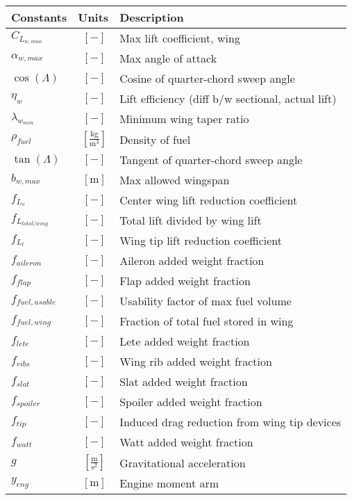 % 

{\footnotesize
\begin{supertabular}{lcl}
\toprule
Constants & Units & Description \\ \midrule
$C_{L_{w,max}}$ & $~[-]$ & Max lift coefficient, wing \\
$\alpha_{w,max}$ & $~[-]$ & Max angle of attack \\
$\cos(\Lambda)$ & $~[-]$ & Cosine of quarter-chord sweep angle \\
$\eta_w$ & $~[-]$ & Lift efficiency (diff b/w sectional, actual lift) \\
$\lambda_{w_{min}}$ & $~[-]$ & Minimum wing taper ratio \\
$\rho_{fuel}$ & $~\mathrm{[\tfrac{kg}{m^{3}}]}$ & Density of fuel \\
$\tan(\Lambda)$ & $~[-]$ & Tangent of quarter-chord sweep angle \\
$b_{w,max}$ & $~\mathrm{[m]}$ & Max allowed wingspan \\
$f_{L_{o}}$ & $~[-]$ & Center wing lift reduction coefficient \\
$f_{L_{total/wing}}$ & $~[-]$ & Total lift divided by wing lift\\
$f_{L_{t}}$ & $~[-]$ & Wing tip lift reduction coefficient \\
$f_{aileron}$ & $~[-]$ & Aileron added weight fraction \\
$f_{flap}$ & $~[-]$ & Flap added weight fraction \\
$f_{fuel, usable}$ & $~[-]$ & Usability factor of max fuel volume\\
$f_{fuel, wing}$ & $~[-]$ & Fraction of total fuel stored in wing\\
$f_{lete}$ & $~[-]$ & Lete added weight fraction \\
$f_{ribs}$ & $~[-]$ & Wing rib added weight fraction \\
$f_{slat}$ & $~[-]$ & Slat added weight fraction \\
$f_{spoiler}$ & $~[-]$ & Spoiler added weight fraction \\
$f_{tip}$ & $~[-]$ & Induced drag reduction from wing tip devices \\
$f_{watt}$ & $~[-]$ & Watt added weight fraction \\
$g$ & $~\mathrm{[\tfrac{m}{s^{2}}]}$ & Gravitational acceleration \\
$y_{eng}$ & $~\mathrm{[m]}$ & Engine moment arm \\

\end{supertabular}}
